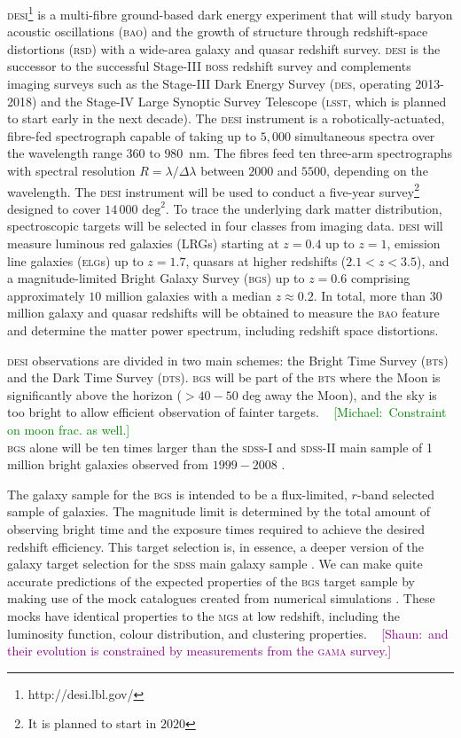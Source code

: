 \documentclass[fleqn,usenatbib]{mnras}
\newcommand{\mike}[1]{~\newline\noindent \textcolor{Green}{{ [Michael:~{#1}]\\}}}
\newcommand{\shaun}[1]{~\newline\noindent \textcolor{Purple}{{ [Shaun:~{#1}]\\}}}
\newcommand{\BAO}{\textsc{bao}\xspace}
\newcommand{\BGS}{\textsc{bgs}\xspace}
\newcommand{\BOSS}{\textsc{boss}\xspace}
\newcommand{\BTS}{\textsc{bts}\xspace}
\newcommand{\DESI}{\textsc{desi}\xspace}
\newcommand{\DES}{\textsc{des}\xspace}
\newcommand{\DTS}{\textsc{dts}\xspace}
\newcommand{\ELGs}{\textsc{elg}s\xspace}
\newcommand{\GAMA}{\textsc{gama}\xspace}
\newcommand{\LSST}{\textsc{lsst}\xspace}
\newcommand{\MGS}{\textsc{mgs}\xspace}
\newcommand{\RSD}{\textsc{rsd}\xspace}
\newcommand{\SDSS}{\textsc{sdss}\xspace}
\begin{document}
\DESI \citep{Aghamousa:2016zmz}\footnote{http://desi.lbl.gov/} is a multi-fibre ground-based dark energy experiment that will study baryon acoustic oscillations (\BAO) and the growth of structure through redshift-space distortions (\RSD) with a wide-area galaxy and quasar redshift survey. \DESI is the successor to the successful Stage-III \BOSS redshift
survey \citep{doi:10.1093/mnras/sts314} and complements imaging surveys such as the Stage-III Dark Energy Survey \citep{Crocce:2017iwq} (\DES, operating 2013-2018) and the Stage-IV Large Synoptic Survey Telescope (\LSST, which is planned to start early in the next decade). The \DESI instrument is a robotically-actuated, fibre-fed spectrograph capable of taking up
to $5,000$ simultaneous spectra over the wavelength range $360$ to $980$~nm. The fibres feed ten three-arm spectrographs with spectral resolution $R = \lambda/\Delta\lambda$ between $2000$ and $5500$, depending on the
wavelength. The \DESI instrument will be used to conduct a five-year survey\footnote{It is planned to start in $2020$} designed to cover $14\,000$ $\textrm{deg}^2$. To trace the underlying dark matter distribution, spectroscopic targets will be selected in four classes from imaging data. \DESI will measure luminous red galaxies (LRGs) starting at $z = 0.4$ up to $z = 1$, emission line galaxies (\ELGs) up to $z = 1.7$, quasars at higher redshifts ($2.1 < z < 3.5$), and a magnitude-limited Bright Galaxy Survey (\BGS) up to $z = 0.6$ comprising approximately $10$ million galaxies with a median $z \approx 0.2$. 
In total, more than 30 million galaxy and quasar redshifts will be obtained to measure the \BAO feature and determine the matter power spectrum, including redshift space distortions.

\DESI observations are divided in two main schemes: the Bright Time Survey (\BTS) and the Dark Time Survey (\DTS). \BGS will be part of the \BTS where the Moon is significantly above the horizon ($> 40 - 50$ deg away the Moon), and the sky is too bright to allow efficient observation of fainter targets.  
\mike{Constraint on moon frac. as well.}
\BGS alone will be ten times larger than the \SDSS-I and \SDSS-II main sample of 1 million bright galaxies observed from $1999-2008$ \citep{Abazajian:2003jy}.

The galaxy sample for the \BGS is intended to be a flux-limited, $r$-band selected sample of galaxies. The magnitude limit is determined by the total amount of observing bright time and the exposure times required to achieve the desired redshift efficiency. This target selection is, in essence, a deeper version of the galaxy target selection for the \SDSS main galaxy sample \cite[\MGS,][]{2002AJ....124.1810S}. We can make quite accurate 
predictions of 
the expected properties of the \BGS target sample by making use of the mock catalogues created from numerical simulations \citep{Smith:2017tzz}. These mocks have identical properties to the \MGS at low redshift, including the luminosity function,
colour distribution, and clustering properties. 
\shaun{and their evolution is constrained by measurements from the \GAMA survey.}
\end{document}
